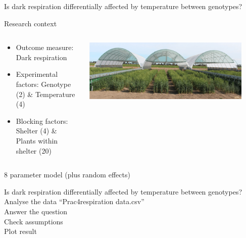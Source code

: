 \documentclass{beamer}
\begin{document}
\begin{frame}{Is dark respiration differentially affected by temperature between genotypes?}
  \begin{block}{Research context}
 \begin{columns}
  \begin{column}{0.8\textwidth}
   \begin{itemize}
      \item Outcome measure: Dark respiration
      \item Experimental factors:  Genotype (2) \& Temperature (4)
      \item Blocking factors:  Shelter (4) \&  Plants within shelter (20)

   \end{itemize}
  \end{column}
  \begin{column}{0.2\textwidth}
    \includegraphics[width=0.9\textwidth]{Figures/darkresp}
  \end{column}

 \end{columns}
 \end{block}

8 parameter model (plus random effects)
 
 \end{frame}

\begin{frame}{Is dark respiration differentially affected by temperature between genotypes?}
 Analyse the data ``Prac4respiration data.csv''\\
 Answer the question\\
 Check assumptions\\
 Plot result
\end{frame}
\end{document}

